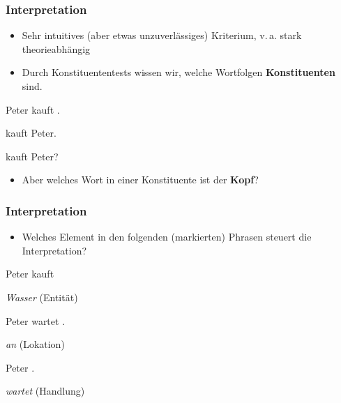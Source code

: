 \begin{frame}
\frametitle{Interpretation}

\begin{itemize}
	\item Sehr intuitives (aber etwas unzuverlässiges) Kriterium, v.\,a. stark theorieabhängig
	\item Durch Konstituententests wissen wir, welche Wortfolgen \textbf{Konstituenten} sind.
\end{itemize}
\pause

\ea Peter kauft .

\pause

\settowidth{}
\ex {} kauft Peter.  

\pause

\ex \alertred{{[}Was]} kauft Peter? \ras {} 
\z

\pause
\begin{itemize}
	\item Aber welches Wort in einer Konstituente ist der \textbf{Kopf}?
\end{itemize} 

\end{frame}


\begin{frame}
\frametitle{Interpretation}

\begin{itemize}
	\item Welches Element in den folgenden (markierten) Phrasen steuert die Interpretation?
\end{itemize}

\pause 
	
	\ea Peter kauft 

\pause
	
	\ras \emph{Wasser} (Entität)

\pause
	\ex Peter wartet .

\pause
	\ras \emph{an} (Lokation)

\pause

	\ex Peter .
	
 \pause

	\ras \emph{wartet} (Handlung)
	
	\z 
	
\end{frame}


